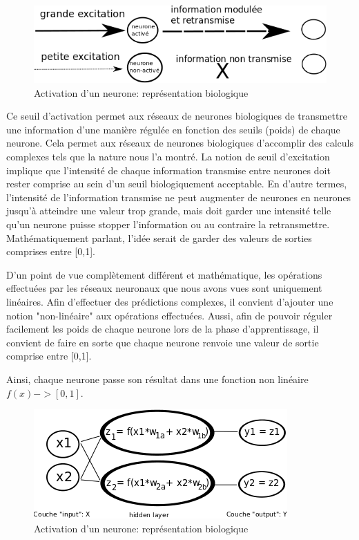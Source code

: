 \documentclass[11pt,a4paper]{report}
\begin{document}
    \begin{figure}[!h]
    \center
    \includegraphics[scale=0.74]{ressources/nn_theory_4.png}
    \caption{Activation d'un neurone: représentation biologique}
    \end{figure} 
    
    \par Ce seuil d'activation permet aux réseaux de neurones biologiques de transmettre une information d'une manière régulée en fonction des seuils (poids) de chaque neurone. Cela permet aux réseaux de neurones biologiques d'accomplir des calculs complexes tels que la nature nous l'a montré. La notion de seuil d'excitation implique que l'intensité de chaque information transmise entre neurones doit rester comprise au sein d'un seuil biologiquement acceptable. En d'autre termes, l'intensité de l'information transmise ne peut augmenter de neurones en neurones jusqu'à atteindre une valeur trop grande, mais doit garder une intensité telle qu'un neurone puisse stopper l'information ou au contraire la retransmettre. Mathématiquement parlant, l'idée serait de garder des valeurs de sorties comprises entre [0,1]. 
    
    \par D'un point de vue complètement différent et mathématique, les opérations effectuées par les réseaux neuronaux que nous avons vues sont uniquement linéaires. Afin d'effectuer des prédictions complexes, il convient d'ajouter une notion "non-linéaire" aux opérations effectuées. Aussi, afin de pouvoir réguler facilement les poids de chaque neurone lors de la phase d'apprentissage, il convient de faire en sorte que chaque neurone renvoie une valeur de sortie comprise entre [0,1].
    
    \par Ainsi, chaque neurone passe son résultat dans une fonction non linéaire $f(x) -> [0,1]$. 
    
    \begin{figure}[!h]
    \center
    \includegraphics[scale=0.74]{ressources/nn_theory_5.png}
    \caption{Activation d'un neurone: représentation biologique}
    \end{figure} 
    
\end{document}

